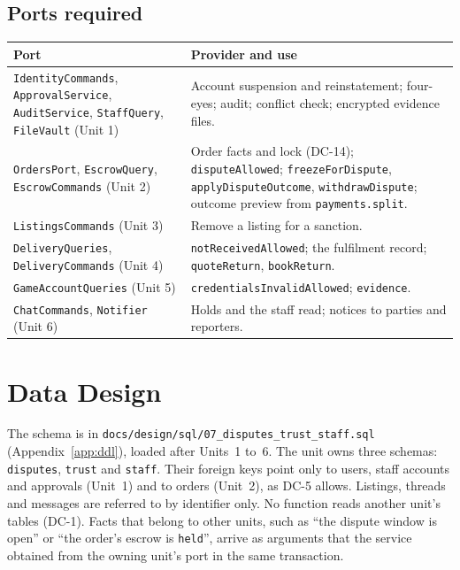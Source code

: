 \documentclass[11pt,a4paper]{article}
\newenvironment{dtable}[1]{\small\begin{longtable}{#1}}{\end{longtable}}
\begin{document}
\subsection{Ports required}
\begin{dtable}{@{}>{\raggedright\arraybackslash}p{4.6cm}>{\raggedright\arraybackslash}p{10.6cm}@{}}
\toprule
\textbf{Port} & \textbf{Provider and use} \\ \midrule \endhead
\texttt{IdentityCommands}, \texttt{ApprovalService}, \texttt{AuditService}, \texttt{StaffQuery}, \texttt{FileVault} (Unit 1) & Account suspension and reinstatement; four-eyes; audit; conflict check; encrypted evidence files. \\
\texttt{OrdersPort}, \texttt{EscrowQuery}, \texttt{EscrowCommands} (Unit 2) & Order facts and lock (DC-14); \texttt{disputeAllowed}; \texttt{freezeForDispute}, \texttt{applyDisputeOutcome}, \texttt{withdrawDispute}; outcome preview from \texttt{payments.split}. \\
\texttt{ListingsCommands} (Unit 3) & Remove a listing for a sanction. \\
\texttt{DeliveryQueries}, \texttt{DeliveryCommands} (Unit 4) & \texttt{notReceivedAllowed}; the fulfilment record; \texttt{quoteReturn}, \texttt{bookReturn}. \\
\texttt{GameAccountQueries} (Unit 5) & \texttt{credentialsInvalidAllowed}; \texttt{evidence}. \\
\texttt{ChatCommands}, \texttt{Notifier} (Unit 6) & Holds and the staff read; notices to parties and reporters. \\
\bottomrule
\end{dtable}
\section{Data Design}
\label{sec:data}
The schema is in \texttt{docs/design/sql/07\_disputes\_trust\_staff.sql} (Appendix~\ref{app:ddl}), loaded after Units~1 to~6. The unit owns three schemas: \texttt{disputes}, \texttt{trust} and \texttt{staff}. Their foreign keys point only to users, staff accounts and approvals (Unit~1) and to orders (Unit~2), as DC-5 allows. Listings, threads and messages are referred to by identifier only. No function reads another unit's tables (DC-1). Facts that belong to other units, such as ``the dispute window is open'' or ``the order's escrow is \texttt{held}'', arrive as arguments that the service obtained from the owning unit's port in the same transaction.
\end{document}
